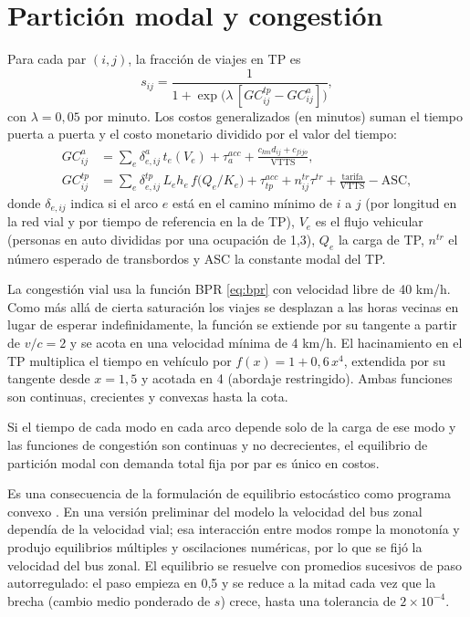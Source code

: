 \section{Partición modal y congestión}

Para cada par $(i,j)$, la fracción de viajes en TP es
\begin{equation}\label{eq:logit}
s_{ij}=\frac{1}{1+\exp\!\big(\lambda\,[GC^{tp}_{ij}-GC^{a}_{ij}]\big)},
\end{equation}
con $\lambda=0{,}05$ por minuto. Los costos generalizados (en minutos) suman el tiempo puerta a puerta y
el costo monetario dividido por el valor del tiempo:
\begin{align}
GC^{a}_{ij}&=\sum_{e}\delta^{a}_{e,ij}\,t_e(V_e)+\tau^{acc}_a+\frac{c_{km}d_{ij}+c_{fijo}}{\mathrm{VTTS}},\\
GC^{tp}_{ij}&=\sum_{e}\delta^{tp}_{e,ij}\,L_eh_e\,f\!\big(Q_e/K_e\big)+\tau^{acc}_{tp}+n^{tr}_{ij}\tau^{tr}+\frac{\text{tarifa}}{\mathrm{VTTS}}-\mathrm{ASC},
\end{align}
donde $\delta_{e,ij}$ indica si el arco $e$ está en el camino mínimo de $i$ a $j$ (por longitud en la
red vial y por tiempo de referencia en la de TP), $V_e$ es el flujo vehicular (personas en auto
divididas por una ocupación de 1,3), $Q_e$ la carga de TP, $n^{tr}$ el número esperado de transbordos y
ASC la constante modal del TP.

La congestión vial usa la función BPR \eqref{eq:bpr} con velocidad libre de 40 km/h. Como más allá de
cierta saturación los viajes se desplazan a las horas vecinas en lugar de esperar indefinidamente, la
función se extiende por su tangente a partir de $v/c=2$ y se acota en una velocidad mínima de 4 km/h. El
hacinamiento en el TP multiplica el tiempo en vehículo por $f(x)=1+0{,}6\,x^4$, extendida por su
tangente desde $x=1{,}5$ y acotada en 4 (abordaje restringido). Ambas funciones son continuas,
crecientes y convexas hasta la cota.

\begin{proposition}
Si el tiempo de cada modo en cada arco depende solo de la carga de ese modo y las funciones de
congestión son continuas y no decrecientes, el equilibrio de partición modal con demanda total fija
por par es único en costos.
\end{proposition}
\noindent Es una consecuencia de la formulación de equilibrio estocástico como programa convexo
\citep{sheffi1985}. En una versión preliminar del modelo la velocidad del bus zonal dependía de la
velocidad vial; esa interacción entre modos rompe la monotonía y produjo equilibrios múltiples y
oscilaciones numéricas, por lo que se fijó la velocidad del bus zonal. El equilibrio se resuelve con
promedios sucesivos de paso autorregulado: el paso empieza en 0,5 y se reduce a la mitad cada vez que la
brecha (cambio medio ponderado de $s$) crece, hasta una tolerancia de $2\times10^{-4}$.

